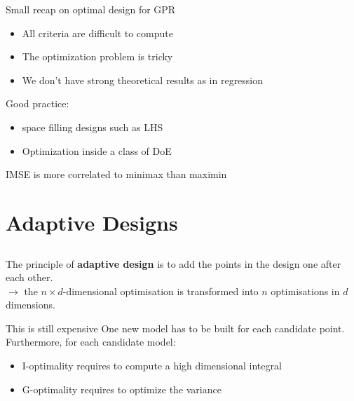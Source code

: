 \documentclass{beamer}
\begin{document}
\begin{frame}{}
Small recap on optimal design for GPR
\begin{itemize}
	\item All criteria are difficult to compute
	\item The optimization problem is tricky
	\item We don't have strong theoretical results as in regression
\end{itemize}
\vspace{3mm}
Good practice:
\begin{itemize}
	\item space filling designs such as LHS
	\item Optimization inside a class of DoE
\end{itemize}
\vspace{3mm}
 IMSE is more correlated to minimax than maximin
\end{frame}

\section[Adaptive DoE]{Adaptive Designs}
\subsection{}

\begin{frame}{}
The principle of \textbf{adaptive design} is to add the points in the design one after each other.\\
\qquad $\rightarrow$ the $n \times d$-dimensional optimisation is transformed into $n$  optimisations in $d$ dimensions.
\begin{block}{This is still expensive}
One new model has to be built for each candidate point. Furthermore, for each candidate model:
	\begin{itemize}
		\item I-optimality requires to compute a high dimensional integral
		\item G-optimality requires to optimize the variance
	\end{itemize}
\end{block}
\end{frame}
\end{document}
